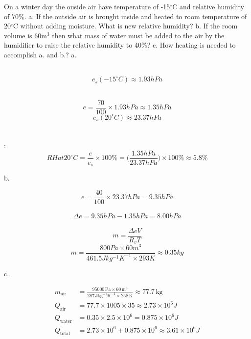 \documentclass[fleqn,10pt]{SelfArx} %
\begin{document}
\begin{question}[\lable=18.1]{On a winter day the ouside air have temperature of -15$^\circ$C and relative humidity of $70\%$.\newline
    a. If the outside air is brought inside and heated to room temperature of 20$^\circ$C without adding moisture. What is new relative humidity?\newline
    b. If the room volume is 60m$^3$ then what mass of water must be added to the air by the humidifier to raise the relative humidity to 40\%?\newline
    c. How heating is needed to accomplish a. and b.?
    }
    \Rightarrow
        \Rightarrow a.  \\  \\ 

            $$e_s(-15^\circ C) \approx 1.93 hPa$$
         \\ 

            $$e =\frac{70}{100}\times 1.93 hPa \approx 1.35hPa$$
            $$e_s(20^\circ C) \approx 23.37 hPa$$
         \\  \\ :
        $$RH at 20^\circ C = \frac{e}{e_s} \times 100\% = \Big(\frac{1.35 hPa}{23.37hPa}\Big) \times 100\% \approx 5.8\%$$

        \Rightarrow b. 

        $$e= \frac{40}{100} \times 23.37hPa = 9.35hPa$$
         \\ 
            $$\Delta e=9.35hPa - 1.35hPa = 8.00hPa$$
        \\ 
            $$m= \frac{\Delta eV}{R_v T}$$
            $$m= \frac{800Pa \times 60 m^3}{461.5Jkg^{-1} K^{-1} \times 293K} \approx 0.35kg$$

    \Rightarrow c. 

    \begin{align*}
        m_{\text{air}} &= \frac{95000 \, \mathrm{Pa} \times 60 \, \mathrm{m^3}}{287 \, \mathrm{Jkg^{-1}K^{-1}} \times 258 \, \mathrm{K}} \approx 77.7 \, \mathrm{kg} \\
        Q_{\text{air}} &= 77.7 \times 1005 \times 35 \approx 2.73 \times 10^6 J \\
        Q_{\text{water}} &= 0.35 \times 2.5 \times 10^6 = 0.875 \times 10^6 J\\
        Q_{\text{total}} &= 2.73 \times 10^6 + 0.875 \times 10^6 \approx 3.61 \times 10^6 J
    \end{align*}
\end{question}
\end{document}
